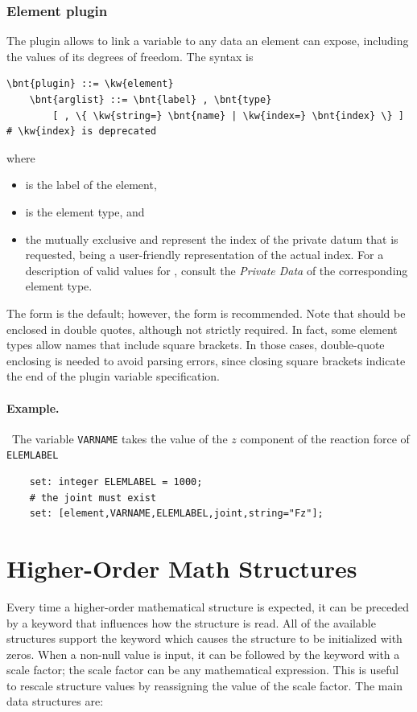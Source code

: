 \subsubsection{Element plugin}
The  plugin allows to link a variable to any data an element
can expose, including the values of its degrees of freedom.
The syntax is
\begin{Verbatim}[commandchars=\\\{\}]
    \bnt{plugin} ::= \kw{element}
    \bnt{arglist} ::= \bnt{label} , \bnt{type}
        [ , \{ \kw{string=} \bnt{name} | \kw{index=} \bnt{index} \} ] # \kw{index} is deprecated
\end{Verbatim}
where
\begin{itemize}
\item {} is the label of the element,
\item {} is the element type, and
\item the mutually exclusive  and  represent the index
of the private datum that is requested,  being a user-friendly
representation of the actual index.
For a description of valid values for , consult the \emph{Private Data} of the corresponding element type.
\end{itemize}
The  form is the default; however, the  form is recommended.
Note that  should be enclosed in double quotes,
although not strictly required.
In fact, some element types allow names that include square brackets.
In those cases, double-quote enclosing is needed to avoid parsing errors,
since closing square brackets indicate the end
of the plugin variable specification.

\paragraph{Example.} \
The variable \texttt{VARNAME} takes the value of the $z$ component 
of the reaction force of \kw{joint} \texttt{ELEMLABEL}
\begin{verbatim}
    set: integer ELEMLABEL = 1000;
    # the joint must exist
    set: [element,VARNAME,ELEMLABEL,joint,string="Fz"];
\end{verbatim}



\section{Higher-Order Math Structures}
Every time a higher-order mathematical structure is expected, it can be
preceded by a keyword that influences how the structure is read.
All of the available structures support the keyword \kw{null}
which causes the structure to be initialized with zeros.
When a non-null value is input, it can be followed by the keyword
\kw{scale} with a scale factor; the scale factor can be any
mathematical expression.
This is useful to rescale structure values by reassigning the value 
of the scale factor.
The main data structures are:

